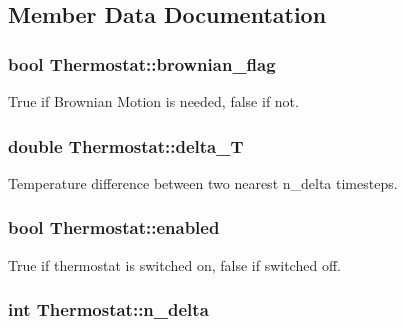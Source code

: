 \subsection{Member Data Documentation}
\hypertarget{classThermostat_a86ae25ddde5ab2ecd7d70a50c8a72823}{
\subsubsection[{brownian\-\_\-flag}]{\setlength{\rightskip}{0pt plus 5cm}bool Thermostat\-::brownian\-\_\-flag\hspace{0.3cm}{\ttfamily [private]}}}\label{classThermostat_a86ae25ddde5ab2ecd7d70a50c8a72823}
True if Brownian Motion is needed, false if not. \hypertarget{classThermostat_a1628e1ae6669caacbb02da75423cc35c}{
\subsubsection[{delta\-\_\-\-T}]{\setlength{\rightskip}{0pt plus 5cm}double Thermostat\-::delta\-\_\-\-T\hspace{0.3cm}{\ttfamily [private]}}}\label{classThermostat_a1628e1ae6669caacbb02da75423cc35c}
Temperature difference between two nearest n\-\_\-delta timesteps. \hypertarget{classThermostat_ae383f11c6ba111f1f14b470a17655d04}{
\subsubsection[{enabled}]{\setlength{\rightskip}{0pt plus 5cm}bool Thermostat\-::enabled\hspace{0.3cm}{\ttfamily [private]}}}\label{classThermostat_ae383f11c6ba111f1f14b470a17655d04}
True if thermostat is switched on, false if switched off. \hypertarget{classThermostat_a9a2715e81ed11171e530e2d22a682244}{
\subsubsection[{n\-\_\-delta}]{\setlength{\rightskip}{0pt plus 5cm}int Thermostat\-::n\-\_\-delta\hspace{0.3cm}{\ttfamily [private]}}}\label{classThermostat_a9a2715e81ed11171e530e2d22a682244}
